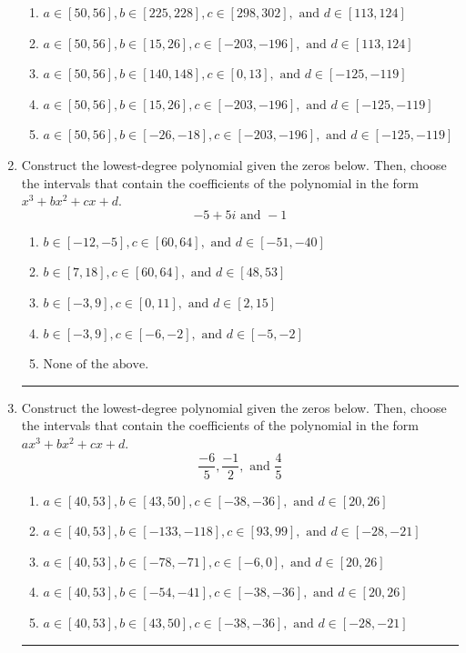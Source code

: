\documentclass[14pt]{extbook}
\newcommand{\litem}[1]{\item#1\hspace*{-1cm}\rule{\textwidth}{0.4pt}}
\begin{document}
\begin{enumerate}
{\begin{enumerate}[label=\Alph*.]
\item \( a \in [50, 56], b \in [225, 228], c \in [298, 302], \text{ and } d \in [113, 124] \)
\item \( a \in [50, 56], b \in [15, 26], c \in [-203, -196], \text{ and } d \in [113, 124] \)
\item \( a \in [50, 56], b \in [140, 148], c \in [0, 13], \text{ and } d \in [-125, -119] \)
\item \( a \in [50, 56], b \in [15, 26], c \in [-203, -196], \text{ and } d \in [-125, -119] \)
\item \( a \in [50, 56], b \in [-26, -18], c \in [-203, -196], \text{ and } d \in [-125, -119] \)

\end{enumerate} }
\litem{
Construct the lowest-degree polynomial given the zeros below. Then, choose the intervals that contain the coefficients of the polynomial in the form $x^3+bx^2+cx+d$.\[ -5 + 5 i \text{ and } -1 \]\begin{enumerate}[label=\Alph*.]
\item \( b \in [-12, -5], c \in [60, 64], \text{ and } d \in [-51, -40] \)
\item \( b \in [7, 18], c \in [60, 64], \text{ and } d \in [48, 53] \)
\item \( b \in [-3, 9], c \in [0, 11], \text{ and } d \in [2, 15] \)
\item \( b \in [-3, 9], c \in [-6, -2], \text{ and } d \in [-5, -2] \)
\item \( \text{None of the above.} \)

\end{enumerate} }
\litem{
Construct the lowest-degree polynomial given the zeros below. Then, choose the intervals that contain the coefficients of the polynomial in the form $ax^3+bx^2+cx+d$.\[ \frac{-6}{5}, \frac{-1}{2}, \text{ and } \frac{4}{5} \]\begin{enumerate}[label=\Alph*.]
\item \( a \in [40, 53], b \in [43, 50], c \in [-38, -36], \text{ and } d \in [20, 26] \)
\item \( a \in [40, 53], b \in [-133, -118], c \in [93, 99], \text{ and } d \in [-28, -21] \)
\item \( a \in [40, 53], b \in [-78, -71], c \in [-6, 0], \text{ and } d \in [20, 26] \)
\item \( a \in [40, 53], b \in [-54, -41], c \in [-38, -36], \text{ and } d \in [20, 26] \)
\item \( a \in [40, 53], b \in [43, 50], c \in [-38, -36], \text{ and } d \in [-28, -21] \)

\end{enumerate} }
\end{enumerate}
\end{document}
